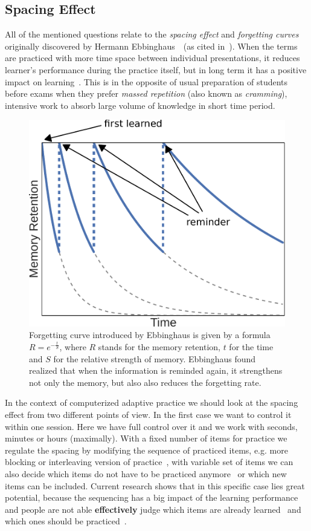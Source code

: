 \documentclass[table,color,cover,twoside,nolot,nolof]{fithesis3/fithesis3}
\begin{document}
\subsection{Spacing Effect}
\label{section:spacing_effect}
All of the mentioned questions relate to the \emph{spacing
effect} and \emph{forgetting curves} originally discovered by Hermann
Ebbinghaus~\cite{ebbinghaus1885spacing}~(as cited
in~\cite{pavlik2005practice}). When the terms are practiced with more time
space between individual presentations, it reduces learner's performance during the
practice itself, but in long term it has a positive impact on
learning~\cite{maass2015how, kornell2009optimising}. This is in the opposite of
usual preparation of students before exams when they prefer \emph{massed
repetition} (also known as \emph{cramming}), intensive work to absorb large
volume of knowledge in short time period.

\begin{figure}
	\begin{center}
		\includegraphics[width=.6\textwidth]{figure/forgetting_curves}
		\caption{Forgetting curve introduced by Ebbinghaus is given by a
			formula $R = e^{-\frac{t}{S}}$, where $R$ stands for the memory retention, $t$
			for the time and $S$ for the relative strength of memory. Ebbinghaus
			found realized that when the information is reminded again, it strengthens
			not only the memory, but also also reduces the forgetting rate.}
	\end{center}
\end{figure}

In the context of computerized adaptive practice we should look at the spacing
effect from two different points of view. In the first case we want to control
it within one session. Here we have full control over it and we work with
seconds, minutes or hours (maximally). With a fixed number of items for
practice we regulate the spacing by modifying the sequence of practiced items,
e.g. more blocking or interleaving version of
practice~\cite{ostrow2015blocking}, with variable set of items we can also
decide which items do not have to be practiced
anymore~\cite{kornell2008optimising} or which new items can be included.
Current research shows that in this specific case lies great potential, because
the sequencing has a big impact of the learning
performance~\cite{ostrow2015blocking} and people are not able \textbf{effectively} judge
which items are already learned~\cite{kornell2008optimising} and which ones
should be practiced~\cite{kornell2014focusing}.
\end{document}
